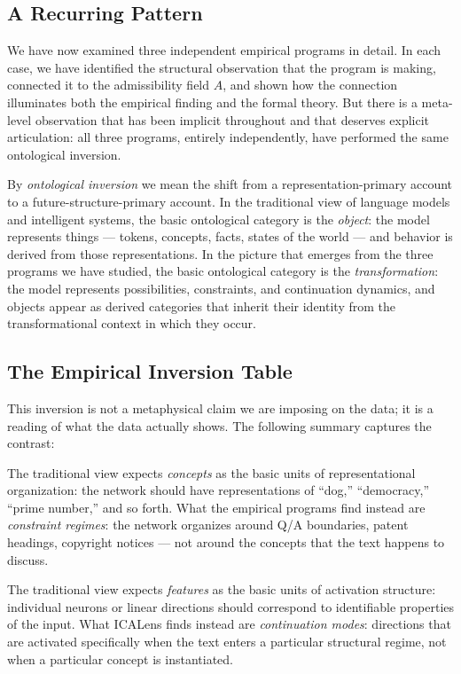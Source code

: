 \documentclass[12pt, a4paper]{article}
\theoremstyle{plain}
\theoremstyle{definition}
\theoremstyle{remark}
\newcommand{\fA}{A}
\begin{document}
\subsection{A Recurring Pattern}

We have now examined three independent empirical programs in detail. In each
case, we have identified the structural observation that the program is
making, connected it to the admissibility field $\fA$, and shown how the
connection illuminates both the empirical finding and the formal theory.
But there is a meta-level observation that has been implicit throughout
and that deserves explicit articulation: all three programs, entirely
independently, have performed the same ontological inversion.

By \emph{ontological inversion} we mean the shift from a
representation-primary account to a future-structure-primary account. In the
traditional view of language models and intelligent systems, the basic
ontological category is the \emph{object}: the model represents things ---
tokens, concepts, facts, states of the world --- and behavior is derived from
those representations. In the picture that emerges from the three programs we
have studied, the basic ontological category is the \emph{transformation}: the
model represents possibilities, constraints, and continuation dynamics, and
objects appear as derived categories that inherit their identity from the
transformational context in which they occur.

\subsection{The Empirical Inversion Table}

This inversion is not a metaphysical claim we are imposing on the data; it is
a reading of what the data actually shows. The following summary captures the
contrast:

The traditional view expects \emph{concepts} as the basic units of
representational organization: the network should have representations of
``dog,'' ``democracy,'' ``prime number,'' and so forth. What the empirical
programs find instead are \emph{constraint regimes}: the network organizes
around Q/A boundaries, patent headings, copyright notices --- not around the
concepts that the text happens to discuss.

The traditional view expects \emph{features} as the basic units of activation
structure: individual neurons or linear directions should correspond to
identifiable properties of the input. What ICALens finds instead are
\emph{continuation modes}: directions that are activated specifically when the
text enters a particular structural regime, not when a particular concept is
instantiated.
\end{document}
